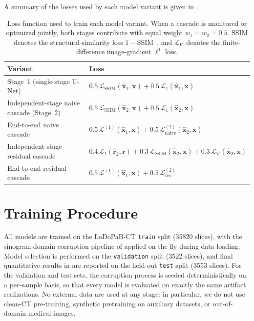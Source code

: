 A summary of the losses used by each model variant is given in .

\begin{table}[!htb]
    \centering
    \caption[Loss function per cascade variant.]{%
        Loss function used to train each model variant. When a cascade is monitored or optimized jointly, both stages contribute with equal weight \(w_{1}=w_{2}=0.5\). SSIM denotes the structural-similarity loss \(1-\mathrm{SSIM}\)~\cite{Wang2004}, and $\mathcal{L}_{\nabla}$ denotes the finite-difference image-gradient $\ell^{1}$ loss.}
    \label{tab:meth_losses}
    \setlength{\tabcolsep}{4pt}
    \small
    \begin{tabular}{@{}l l@{}}
        \toprule
        Variant & Loss \\
        \midrule
        Stage~1 (single-stage U-Net) &
        $0.5\,\mathcal{L}_{\mathrm{SSIM}}(\hat{\mathbf{x}}_{1},\mathbf{x}) + 0.5\,\mathcal{L}_{1}(\hat{\mathbf{x}}_{1},\mathbf{x})$ \\
        Independent-stage naive cascade (Stage~2) &
        $0.5\,\mathcal{L}_{\mathrm{SSIM}}(\hat{\mathbf{x}}_{2},\mathbf{x}) + 0.5\,\mathcal{L}_{1}(\hat{\mathbf{x}}_{2},\mathbf{x})$ \\
        End-to-end naive cascade &
        $0.5\,\mathcal{L}^{(1)}(\hat{\mathbf{x}}_{1},\mathbf{x}) + 0.5\,\mathcal{L}^{(2)}_{\mathrm{naive}}(\hat{\mathbf{x}}_{2},\mathbf{x})$ \\
        Independent-stage residual cascade &
        $0.4\,\mathcal{L}_{1}(\hat{\mathbf{r}}_{2},\mathbf{r}) + 0.3\,\mathcal{L}_{\mathrm{SSIM}}(\hat{\mathbf{x}}_{2},\mathbf{x}) + 0.3\,\mathcal{L}_{\nabla}(\hat{\mathbf{x}}_{2},\mathbf{x})$ \\
        End-to-end residual cascade &
        $0.5\,\mathcal{L}^{(1)}(\hat{\mathbf{x}}_{1},\mathbf{x}) + 0.5\,\mathcal{L}^{(2)}_{\mathrm{res}}$ \\
        \bottomrule
    \end{tabular}
\end{table}
\section{Training Procedure}
\label{sec:meth_training}

All models are trained on the \mbox{LoDoPaB-CT} \texttt{train} split (\num{35820} slices), with the sinogram-domain corruption pipeline of  applied on the fly during data loading. Model selection is performed on the \texttt{validation} split (\num{3522} slices), and final quantitative results in  are reported on the held-out \texttt{test} split (\num{3553} slices). For the validation and test sets, the corruption process is seeded deterministically on a per-sample basis, so that every model is evaluated on exactly the same artifact realizations. No external data are used at any stage: in particular, we do not use clean-CT pre-training, synthetic pretraining on auxiliary datasets, or out-of-domain medical images.

